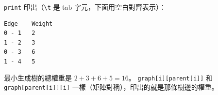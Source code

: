 \begin{pastsoln}
\texttt{print} 印出（\texttt{\textbackslash t} 是 tab 字元，下面用空白對齊表示）：
\begin{verbatim}
Edge    Weight
0 - 1   2
1 - 2   3
0 - 3   6
1 - 4   5
\end{verbatim}
最小生成樹的總權重是 $2 + 3 + 6 + 5 = 16$。 \texttt{graph[i][parent[i]]} 和 \texttt{graph[parent[i]][i]}
一樣（矩陣對稱），印出的就是那條樹邊的權重。
\end{pastsoln}
